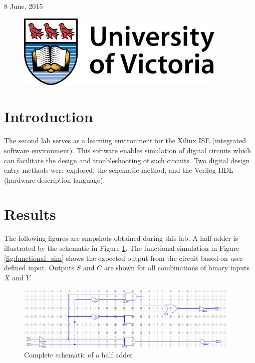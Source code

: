 \documentclass[11pt]{article}
\begin{document}
\begin{titlepage}
{\large 8 June, 2015}\\ %

\begin{figure}[b]	 %
	\centering
	\includegraphics[scale=0.3]{UVic_logo}
\end{figure}

\end{titlepage}


\section{Introduction}

The second lab serves as a learning environment for the Xilinx ISE (integrated software environment). This software enables simulation of digital circuits which can facilitate the design and troubleshooting of such circuits. Two digital design entry methods were explored: the schematic method, and the Verilog HDL (hardware description language).  

\section{Results}

The following figures are snapshots obtained during this lab. A half adder is illustrated by the schematic in Figure \ref{fig:schematic}. The functional simulation in Figure \ref{fig:functional_sim} shows the expected output from the circuit based on user-defined input. Outputs $S$ and $C$ are shown for all combinations of binary inputs $X$ and $Y$.

\begin{figure}[htbp]
	\centering
	\includegraphics[width=0.95\textwidth, draft=false]{ha_schematic}
	\caption{Complete schematic of a half adder}
	\label{fig:schematic}
\end{figure}
\end{document}
